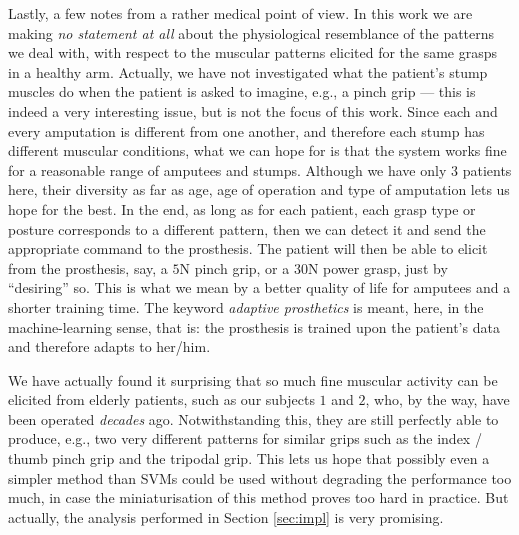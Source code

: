 Lastly, a few notes from a rather medical point of view. In this work
we are making \emph{no statement at all} about the physiological
resemblance of the patterns we deal with, with respect to the muscular
patterns elicited for the same grasps in a healthy arm. Actually, we
have not investigated what the patient's stump muscles do when the
patient is asked to imagine, e.g., a pinch grip --- this is indeed a
very interesting issue, but is not the focus of this work. Since each
and every amputation is different from one another, and therefore each
stump has different muscular conditions, what we can hope for is that
the system works fine for a reasonable range of amputees and
stumps. Although we have only $3$ patients here, their diversity as
far as age, age of operation and type of amputation lets us hope for
the best. In the end, as long as for each patient, each grasp type or
posture corresponds to a different pattern, then we can detect it and
send the appropriate command to the prosthesis. The patient will then
be able to elicit from the prosthesis, say, a $5$N pinch grip, or a
$30$N power grasp, just by ``desiring'' so. This is what we mean by a
better quality of life for amputees and a shorter training time. The
keyword \emph{adaptive prosthetics} is meant, here, in the
machine-learning sense, that is: the prosthesis is trained upon the
patient's data and therefore adapts to her/him.

We have actually found it surprising that so much fine muscular
activity can be elicited from elderly patients, such as our subjects
$1$ and $2$, who, by the way, have been operated \emph{decades}
ago. Notwithstanding this, they are still perfectly able to produce,
e.g., two very different patterns for similar grips such as the index
/ thumb pinch grip and the tripodal grip. This lets us hope that
possibly even a simpler method than SVMs could be used without
degrading the performance too much, in case the miniaturisation of
this method proves too hard in practice. But actually, the analysis
performed in Section \ref{sec:impl} is very promising.

